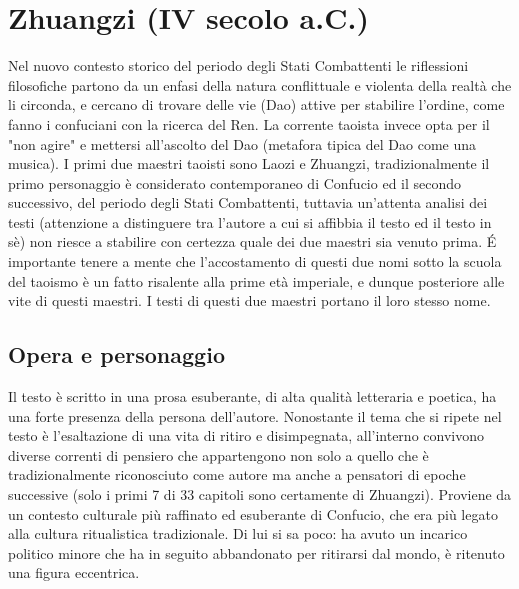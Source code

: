 \documentclass[10pt,a4paper]{report}
\begin{document}
\section{Zhuangzi (IV secolo a.C.)}
Nel nuovo contesto storico del periodo degli Stati Combattenti le riflessioni filosofiche partono da un enfasi della natura conflittuale e violenta della realtà che li circonda, e cercano di trovare delle vie (Dao) attive per stabilire l'ordine, come fanno i confuciani con la ricerca del Ren. La corrente taoista invece opta per il "non agire" e mettersi all'ascolto del Dao (metafora tipica del Dao come una musica). I primi due maestri taoisti sono Laozi e Zhuangzi, tradizionalmente il primo personaggio è considerato contemporaneo di Confucio ed il secondo successivo, del periodo degli Stati Combattenti, tuttavia un'attenta analisi dei testi (attenzione a distinguere tra l'autore a cui si affibbia il testo ed il testo in sè) non riesce a stabilire con certezza quale dei due maestri sia venuto prima. \'E importante tenere a mente che l'accostamento di questi due nomi sotto la scuola del taoismo è un fatto risalente alla prime età imperiale, e dunque posteriore alle vite di questi maestri. I testi di questi due maestri portano il loro stesso nome.
\subsection{Opera e personaggio}
Il testo è scritto in una prosa esuberante, di alta qualità letteraria e poetica, ha una forte presenza della persona dell'autore. Nonostante il tema che si ripete nel testo è l'esaltazione di una vita di ritiro e disimpegnata, all'interno convivono diverse correnti di pensiero che appartengono non solo a quello che è tradizionalmente riconosciuto come autore ma anche a pensatori di epoche successive (solo i primi 7 di 33 capitoli sono certamente di Zhuangzi). Proviene da un contesto culturale più raffinato ed esuberante di Confucio, che era più legato alla cultura ritualistica tradizionale. Di lui si sa poco: ha avuto un incarico politico minore che ha in seguito abbandonato per ritirarsi dal mondo, è ritenuto una figura eccentrica. 
\end{document}
